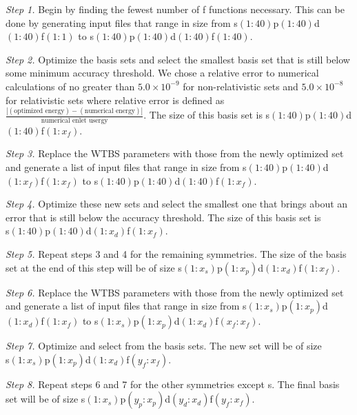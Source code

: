 \textit{Step 1.} Begin by finding the fewest number of f functions necessary. This can be done by generating input files that range in size from  \mbox{s$(1:40)$p$(1:40)$d$(1:40)$f$(1:1)$} to  \mbox{s$(1:40)$p$(1:40)$d$(1:40)$f$(1:40)$}.

\textit{Step 2.} Optimize the basis sets and select the smallest basis set that is still below some minimum accuracy threshold. We chose a relative error to numerical calculations of no greater than $5.0\times10^{-9}$ for non-relativistic sets and $5.0\times10^{-8}$ for relativistic sets where relative error is defined as $\frac{|(\text{optimized energy}) - (\text{numerical energy})|}{\text{numerical enlet usergy}}$. The size of this basis set is  \mbox{s$(1:40)$p$(1:40)$d$(1:40)$f$(1:x_{f})$}.

\textit{Step 3.} Replace the WTBS parameters with those from the newly optimized set and generate a list of input files that range in size from  \mbox{s$(1:40)$p$(1:40)$d$(1:x_{f})$f$(1:x_{f})$} to  \mbox{s$(1:40)$p$(1:40)$d$(1:40)$f$(1:x_{f})$}.

\textit{Step 4.} Optimize these new sets and select the smallest one that brings about an error that is still below the accuracy threshold. The size of this basis set is \\ \mbox{s$(1:40)$p$(1:40)$d$(1:x_{d})$f$(1:x_{f})$}.

\textit{Step 5.} Repeat steps 3 and 4 for the remaining symmetries. The size of the basis set at the end of this step will be of size  \mbox{s$(1:x_{s})$p$(1:x_{p})$d$(1:x_{d})$f$(1:x_{f})$}.

\textit{Step 6.} Replace the WTBS parameters with those from the newly optimized set and generate a list of input files that range in size from  \mbox{s$(1:x_{s})$p$(1:x_{p})$d$(1:x_{d})$f$(1:x_{f})$} to  \mbox{s$(1:x_{s})$p$(1:x_{p})$d$(1:x_{d})$f$(x_{f}:x_{f})$}.

\textit{Step 7.} Optimize and select from the basis sets. The new set will be of size  \\ \mbox{s$(1:x_{s})$p$(1:x_{p})$d$(1:x_{d})$f$(y_{f}:x_{f})$}.

\textit{Step 8.} Repeat steps 6 and 7 for the other symmetries except s. The final basis set will be of size  \mbox{s$(1:x_{s})$p$(y_{p}:x_{p})$d$(y_{d}:x_{d})$f$(y_{f}:x_{f})$}.

